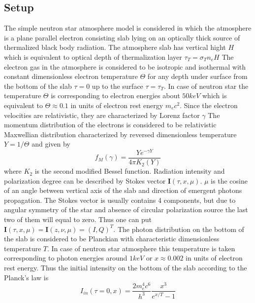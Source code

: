 \documentclass[iop, usenatbib]{emulateapj}
\newcommand{\be}{\begin{equation}}
\newcommand{\ee}{\end{equation}}
\begin{document}
\subsection{Setup}
The simple neutron star atmosphere model is considered in which the atmosphere is a plane parallel electron consisting slab lying on an optically thick source of thermalized  black body radiation.
The atmosphere slab has vertical hight $H$ which is equivalent to optical depth of thermalization layer $\tau_T=\sigma_Tn_eH$    
The electron gas in the atmosphere is considered to be isotropic and isothermal with constant dimensionless electron temperature $\Theta$ for any depth under surface from the bottom of the slab $\tau=0$ up to the surface $\tau=\tau_T$.
In case of neutron star the temperature $\Theta$ is corresponding to electron energies about $50 keV$ which is equivalent to $\Theta\approx 0.1$ in units of electron rest energy $m_ec^2$. 
Since the electron velocities are relativistic, they are characterized by Lorenz factor $\gamma$
The momentum distribution of the electrons is considered to be relativistic Maxwellian distribution characterized by reversed dimensionless temperature $Y = 1/ \Theta$ and given by 
\be 
\label{eq:Maxwell}
f_M(\gamma)= \frac{Y e^{-\gamma Y}}{4\pi K_2(Y)}
\ee
where $K_2$ is the second modified Bessel function.  
Radiation intensity and polarization degree can be described by Stokes vector $\bm{I}(\tau,x,\mu)$. $\mu$ is the cosine of an angle between vertical axis of the slab and direction of emergent photons propagation.  
The Stokes vector is usually contains 4 components, but due to angular symmetry of the star and absence of circular polarization source the last two of them will equal to zero.
Thus one can put $\bm{I}(\tau,x,\mu)=\bm{I}(z,\nu,\mu) = (I,Q)^T$.
The photon distribution on the bottom of the slab is considered to be Planckian with characteristic dimensionless temperature $T$.  In case of neutron star atmosphere this temperature is taken corresponding to photon energies around $1keV$ or $x\approx 0.002$ in  units of electron rest energy.
Thus the initial intensity on the bottom of the slab according to the Planck's law is
\be
I_{in}(\tau=0,x)=\frac{2m_e^4c^6}{h^3}\frac{x^3}{e^{x/T}-1}
\ee   
\end{document}
